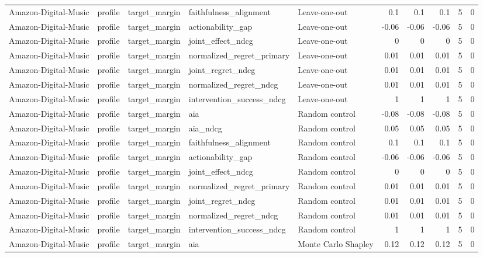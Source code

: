 \begin{table}[t]
{\begin{tabular}{lllllrrrrr}
Amazon-Digital-Music & profile & target\_margin & faithfulness\_alignment & Leave-one-out & 0.1 & 0.1 & 0.1 & 5 & 0 \\
Amazon-Digital-Music & profile & target\_margin & actionability\_gap & Leave-one-out & -0.06 & -0.06 & -0.06 & 5 & 0 \\
Amazon-Digital-Music & profile & target\_margin & joint\_effect\_ndcg & Leave-one-out & 0 & 0 & 0 & 5 & 0 \\
Amazon-Digital-Music & profile & target\_margin & normalized\_regret\_primary & Leave-one-out & 0.01 & 0.01 & 0.01 & 5 & 0 \\
Amazon-Digital-Music & profile & target\_margin & joint\_regret\_ndcg & Leave-one-out & 0.01 & 0.01 & 0.01 & 5 & 0 \\
Amazon-Digital-Music & profile & target\_margin & normalized\_regret\_ndcg & Leave-one-out & 0.01 & 0.01 & 0.01 & 5 & 0 \\
Amazon-Digital-Music & profile & target\_margin & intervention\_success\_ndcg & Leave-one-out & 1 & 1 & 1 & 5 & 0 \\
Amazon-Digital-Music & profile & target\_margin & aia & Random control & -0.08 & -0.08 & -0.08 & 5 & 0 \\
Amazon-Digital-Music & profile & target\_margin & aia\_ndcg & Random control & 0.05 & 0.05 & 0.05 & 5 & 0 \\
Amazon-Digital-Music & profile & target\_margin & faithfulness\_alignment & Random control & 0.1 & 0.1 & 0.1 & 5 & 0 \\
Amazon-Digital-Music & profile & target\_margin & actionability\_gap & Random control & -0.06 & -0.06 & -0.06 & 5 & 0 \\
Amazon-Digital-Music & profile & target\_margin & joint\_effect\_ndcg & Random control & 0 & 0 & 0 & 5 & 0 \\
Amazon-Digital-Music & profile & target\_margin & normalized\_regret\_primary & Random control & 0.01 & 0.01 & 0.01 & 5 & 0 \\
Amazon-Digital-Music & profile & target\_margin & joint\_regret\_ndcg & Random control & 0.01 & 0.01 & 0.01 & 5 & 0 \\
Amazon-Digital-Music & profile & target\_margin & normalized\_regret\_ndcg & Random control & 0.01 & 0.01 & 0.01 & 5 & 0 \\
Amazon-Digital-Music & profile & target\_margin & intervention\_success\_ndcg & Random control & 1 & 1 & 1 & 5 & 0 \\
Amazon-Digital-Music & profile & target\_margin & aia & Monte Carlo Shapley & 0.12 & 0.12 & 0.12 & 5 & 0 \\

\end{tabular}}
\end{table}
